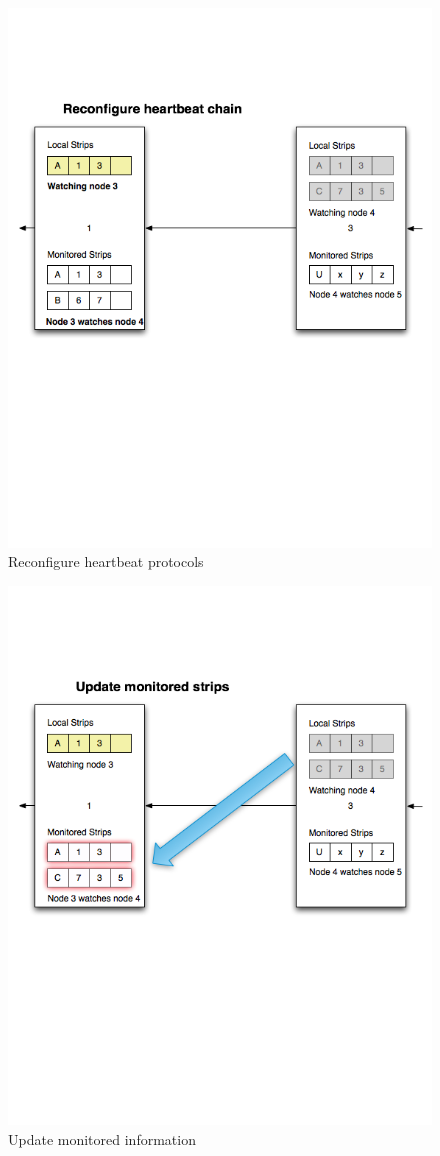 \begin{figure}[h!]
\caption{Reconfigure heartbeat protocols}
\label{fig:strip9}
\centering
    \includegraphics[width=\linewidth]{figures/strip9}
\end{figure}

\begin{figure}[h!]
\caption{Update monitored information}
\label{fig:strip10}
\centering
    \includegraphics[width=\linewidth]{figures/strip10}
\end{figure}
